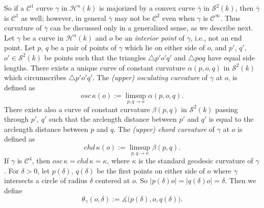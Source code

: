 \documentclass[11pt]{amsart}
\theoremstyle{definition}
\newcommand{\ol}{\overline}
\newcommand{\C}{\mathcal{C}}
\begin{document}
So if a $\C^1$ curve $\gamma$ in $\mathcal{H}^n(k)$ is majorized by a convex curve $\ol\gamma$ in $\mathcal{S}^2(k)$, then $\ol\gamma$ is $\C^1$ as well; however, in general $\ol\gamma$ may not be $\C^2$ even when $\gamma$ is $\C^\infty$. Thus curvature of $\ol\gamma$ can be discussed only in a generalized sense, as we describe next. Let $\gamma$ be a curve in $\mathcal{H}^n(k)$ and  $o$ be an \emph{interior point} of $\gamma$, i.e., not an end point. Let $p$, $q$ be a pair of points of $\gamma$ which lie on either side of $o$, and $p'$, $q'$, $o'\in\mathcal{S}^2(k)$ be points such that the triangles $\triangle p'o'q'$ and $\triangle poq$ have equal side lengths. There exists a unique curve of constant curvature $\alpha(p,o,q)$ in $\mathcal{S}^2(k)$ which circumscribes $\triangle p'o'q'$. The \emph{(upper) osculating curvature} of $\gamma$ at $o$, is defined  as
$$
osc\,\kappa(o):=\limsup_{p,q\to o} \alpha(p,o,q).
$$
There exists also a curve of constant curvature $\beta(p,q)$ in $\mathcal{S}^2(k)$ passing through $p'$, $q'$ such that the arclength distance between $p'$ and $q'$  is equal to the arclength distance between $p$ and $q$. The \emph{(upper) chord curvature} of $\gamma$ at $o$ is defined as 
$$
chd\,\kappa(o):=\limsup_{p,q\to o} \beta(p,q).
$$
If $\gamma$ is $\C^4$, then $osc\,\kappa=chd\,\kappa=\kappa$, where $\kappa$
is the standard geodesic curvature of $\gamma$ \cite{alexander-bishop1996}. For $\delta>0$, let $p(\delta)$, $q(\delta)$ be the first points on either side of $o$ where $\gamma$ intersects a circle of radius $\delta$ centered at $o$. So $|p(\delta)o|=|q(\delta)o|=\delta$. Then we define
$$
\theta_{\gamma}(o,\delta):=\measuredangle \big(p(\delta),o,q(\delta)\big).
$$
\end{document}
